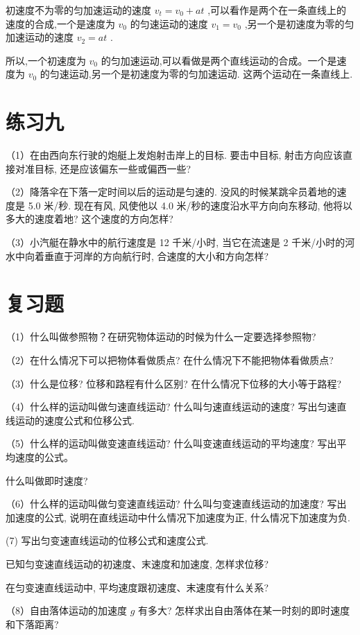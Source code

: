 \documentclass[10pt]{article}
\begin{document}
初速度不为零的匀加速运动的速度 \({v}_{t} = {v}_{0} + {at}\) ,可以看作是两个在一条直线上的速度的合成,一个是速度为 \({v}_{0}\) 的匀速运动的速度 \({v}_{1} = {v}_{0}\) ,另一个是初速度为零的匀加速运动的速度 \({v}_{2} = {at}\) .

所以,一个初速度为 \({v}_{0}\) 的匀加速运动,可以看做是两个直线运动的合成。一个是速度为 \({v}_{0}\) 的匀速运动,另一个是初速度为零的匀加速运动. 这两个运动在一条直线上.

\section*{练习九}

（1）在由西向东行驶的炮艇上发炮射击岸上的目标. 要击中目标, 射击方向应该直接对准目标, 还是应该偏东一些或偏西一些?

（2）降落伞在下落一定时间以后的运动是匀速的. 没风的时候某跳伞员着地的速度是 5.0 米/秒. 现在有风, 风使他以 4.0 米/秒的速度沿水平方向向东移动, 他将以多大的速度着地? 这个速度的方向怎样?

（3）小汽艇在静水中的航行速度是 12 千米/小时, 当它在流速是 2 千米/小时的河水中向着垂直于河岸的方向航行时, 合速度的大小和方向怎样?

\section*{复习题}

（1）什么叫做参照物？在研究物体运动的时候为什么一定要选择参照物?

（2）在什么情况下可以把物体看做质点? 在什么情况下不能把物体看做质点?

（3）什么是位移? 位移和路程有什么区别? 在什么情况下位移的大小等于路程?

（4）什么样的运动叫做匀速直线运动? 什么叫匀速直线运动的速度? 写出匀速直线运动的速度公式和位移公式.

（5）什么样的运动叫做变速直线运动? 什么叫变速直线运动的平均速度? 写出平均速度的公式。

什么叫做即时速度?

（6）什么样的运动叫做匀变速直线运动? 什么叫匀变速直线运动的加速度? 写出加速度的公式, 说明在直线运动中什么情况下加速度为正, 什么情况下加速度为负.

(7) 写出匀变速直线运动的位移公式和速度公式.

已知匀变速直线运动的初速度、末速度和加速度, 怎样求位移?

在匀变速直线运动中, 平均速度跟初速度、末速度有什么关系?

（8）自由落体运动的加速度 \(g\) 有多大? 怎样求出自由落体在某一时刻的即时速度和下落距离?
\end{document}
